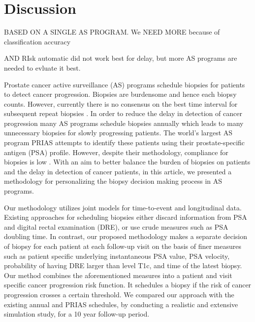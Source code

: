 
\section{Discussion}
\label{sec:discussion}
BASED ON A SINGLE AS PROGRAM. We NEED MORE because of classification accuracy 

AND RIsk automatic did not work best for delay, but more AS programs are needed to evluate it best.

Prostate cancer active surveillance (AS) programs schedule biopsies for patients to detect cancer progression. Biopsies are burdensome and hence each biopsy counts. However, currently there is no consensus on the best time interval for subsequent repeat biopsies \cite{loeb2014heterogeneity}. In order to reduce the delay in detection of cancer progression many AS programs schedule biopsies annually which leads to many unnecessary biopsies for slowly progressing patients. The world's largest AS program PRIAS attempts to identify these patients using their prostate-specific antigen (PSA) profile. However, despite their methodology, compliance for biopsies is low \citep{bokhorst2015compliance}. With an aim to better balance the burden of biopsies on patients and the delay in detection of cancer patients, in this article, we presented a methodology for personalizing the biopsy decision making process in AS programs.

Our methodology utilizes joint models for time-to-event and longitudinal data. Existing approaches for scheduling biopsies either discard information from PSA and digital rectal examination (DRE), or use crude measures such as PSA doubling time. In contrast, our proposed methodology makes a separate decision of biopsy for each patient at each follow-up visit on the basis of finer measures such as patient specific underlying instantaneous PSA value, PSA velocity, probability of having DRE larger than level T1c, and time of the latest biopsy. Our method combines the aforementioned measures into a patient and visit specific cancer progression risk function. It schedules a biopsy if the risk of cancer progression crosses a certain threshold. We compared our approach with the existing annual and PRIAS schedules, by conducting a realistic and extensive simulation study, for a 10 year follow-up period.

